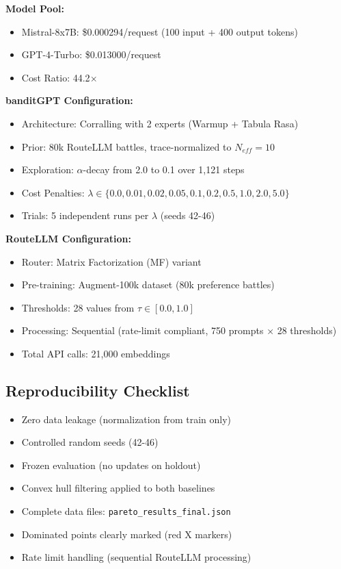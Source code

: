 \textbf{Model Pool:}
\begin{itemize}
    \item Mistral-8x7B: \$0.000294/request (100 input + 400 output tokens)
    \item GPT-4-Turbo: \$0.013000/request
    \item Cost Ratio: 44.2$\times$
\end{itemize}

\textbf{banditGPT Configuration:}
\begin{itemize}
    \item Architecture: Corralling with 2 experts (Warmup + Tabula Rasa)
    \item Prior: 80k RouteLLM battles, trace-normalized to $N_{eff}=10$
    \item Exploration: $\alpha$-decay from 2.0 to 0.1 over 1,121 steps
    \item Cost Penalties: $\lambda \in \{0.0, 0.01, 0.02, 0.05, 0.1, 0.2, 0.5, 1.0, 2.0, 5.0\}$
    \item Trials: 5 independent runs per $\lambda$ (seeds 42{-}46)
\end{itemize}

\textbf{RouteLLM Configuration:}
\begin{itemize}
    \item Router: Matrix Factorization (MF) variant~\cite{routellm2024}
    \item Pre-training: Augment-100k dataset (80k preference battles)
    \item Thresholds: 28 values from $\tau \in [0.0, 1.0]$
    \item Processing: Sequential (rate-limit compliant, 750 prompts × 28 thresholds)
    \item Total API calls: 21,000 embeddings
\end{itemize}

\subsection*{Reproducibility Checklist}

\begin{itemize}
    \item[$\checkmark$] Zero data leakage (normalization from train only)
    \item[$\checkmark$] Controlled random seeds (42{-}46)
    \item[$\checkmark$] Frozen evaluation (no updates on holdout)
    \item[$\checkmark$] Convex hull filtering applied to both baselines
    \item[$\checkmark$] Complete data files: \texttt{pareto\_results\_final.json}
    \item[$\checkmark$] Dominated points clearly marked (red X markers)
    \item[$\checkmark$] Rate limit handling (sequential RouteLLM processing)
\end{itemize}

